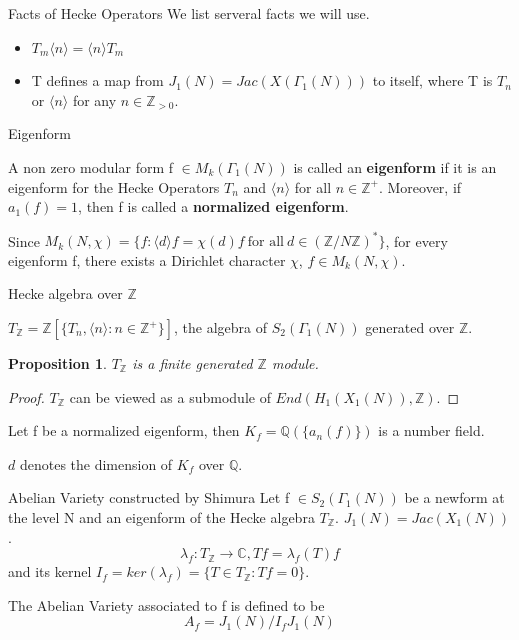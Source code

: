 \documentclass{beamer}
\theoremstyle{plain}
\newtheorem{proposition}{Proposition}[section]
\theoremstyle{definition}
\theoremstyle{remark}
\newcommand{\Q}{\mathbb{Q}}
\newcommand{\Z}{\mathbb{Z}}
\begin{document}
\begin{frame}{Facts of Hecke Operators}
    We list serveral facts we will use.
    \begin{itemize}
        \item $T_m \langle n \rangle=\langle n \rangle T_m$
        \item T defines a map from $J_1(N)=Jac(X(\Gamma_1(N))) $ to itself, where T is $T_n$ or $\langle n \rangle$ for any $n \in \Z_{>0}$.
    \end{itemize}
\end{frame}


\begin{frame}{Eigenform }
    \begin{definition}
        A non zero modular form f $\in M_k(\Gamma_1(N))$ is called an \textbf{eigenform} if it is an eigenform for the Hecke Operators $T_n$ and
        $\langle n \rangle$ for all $n \in \Z^+$. Moreover, if $a_1(f)=1$, then f is called a \textbf{normalized eigenform}.
    \end{definition}
    Since $M_k(N,\chi)=\{f: \langle d\rangle f=\chi(d)f \  \text{for all} \ d\in (\Z/N\Z)^* \}$,
    for every eigenform f, there exists a Dirichlet character $\chi$, $f\in M_k(N,\chi)$.

\end{frame}

\begin{frame}{Hecke algebra over $\Z$}
    \begin{definition}
        $T_{\Z}=\Z[\{T_n,\langle n \rangle:n \in \Z^+\}]$, the algebra of $S_2(\Gamma_1(N))$ generated over $\Z$.
    \end{definition}\pause
    \begin{proposition}
        $T_{\Z}$ is a finite generated $\Z$ module.
    \end{proposition}
    \begin{proof}
        $T_{\Z}$ can be viewed as a submodule of $End(H_1(X_1(N)),\Z)$.
    \end{proof}\pause
    \begin{corollary}
        Let f be a normalized eigenform, then $K_f=\Q(\{a_n(f)\})$ is a number field.
    \end{corollary}
    $d$ denotes the dimension of $K_f$ over $\Q$.
\end{frame}

\begin{frame}{Abelian Variety constructed by Shimura}
    Let f $\in S_2(\Gamma_1(N))$ be a newform at the level N and an eigenform of
    the Hecke algebra $T_{\Z}$. $J_1(N)=Jac(X_1(N))$.
    \[\lambda_f : T_{\Z} \to \mathbb{C}, Tf=\lambda_f(T)f\]
    and its kernel $I_f=ker(\lambda_f)=\{T\in T_{\Z}: Tf=0\}$.
    \begin{definition}
        The Abelian Variety associated to f is defined to be
        \[A_f=J_1(N)/I_fJ_1(N)\]
    \end{definition}
\end{frame}
\end{document}
